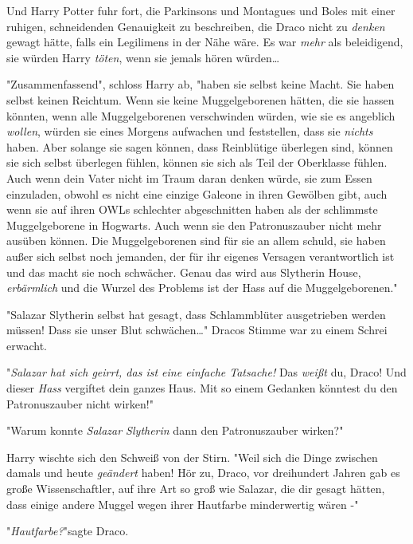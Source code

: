 {Und Harry Potter fuhr fort, die Parkinsons und Montagues und Boles mit einer ruhigen, schneidenden Genauigkeit zu beschreiben, die Draco nicht zu \emph{denken} gewagt hätte, falls ein Legilimens in der Nähe wäre. Es war \emph{mehr} als beleidigend, sie würden Harry \emph{töten}, wenn sie jemals hören würden…

"Zusammenfassend", schloss Harry ab, "haben sie selbst keine Macht. Sie haben selbst keinen Reichtum. Wenn sie keine Muggelgeborenen hätten, die sie hassen könnten, wenn alle Muggelgeborenen verschwinden würden, wie sie es angeblich \emph{wollen}, würden sie eines Morgens aufwachen und feststellen, dass sie \emph{nichts} haben. Aber solange sie sagen können, dass Reinblütige überlegen sind, können sie sich selbst überlegen fühlen, können sie sich als Teil der Oberklasse fühlen. Auch wenn dein Vater nicht im Traum daran denken würde, sie zum Essen einzuladen, obwohl es nicht eine einzige Galeone in ihren Gewölben gibt, auch wenn sie auf ihren OWLs schlechter abgeschnitten haben als der schlimmste Muggelgeborene in Hogwarts. Auch wenn sie den Patronuszauber nicht mehr ausüben können. Die Muggelgeborenen sind für sie an allem schuld, sie haben außer sich selbst noch jemanden, der für ihr eigenes Versagen verantwortlich ist und das macht sie noch schwächer. Genau das wird aus Slytherin House, \emph{erbärmlich} und die Wurzel des Problems ist der Hass auf die Muggelgeborenen."

"Salazar Slytherin selbst hat gesagt, dass Schlammblüter ausgetrieben werden müssen! Dass sie unser Blut schwächen…" Dracos Stimme war zu einem Schrei erwacht.

"\emph{Salazar hat sich geirrt, das ist eine einfache Tatsache!} Das \emph{weißt} du, Draco! Und dieser \emph{Hass} vergiftet dein ganzes Haus. Mit so einem Gedanken könntest du den Patronuszauber nicht wirken!"

"Warum konnte \emph{Salazar Slytherin} dann den Patronuszauber wirken?"

Harry wischte sich den Schweiß von der Stirn. "Weil sich die Dinge zwischen damals und heute \emph{geändert} haben! Hör zu, Draco, vor dreihundert Jahren gab es große Wissenschaftler, auf ihre Art so groß wie Salazar, die dir gesagt hätten, dass einige andere Muggel wegen ihrer Hautfarbe minderwertig wären -"

"\emph{Hautfarbe?}"sagte Draco.

}
